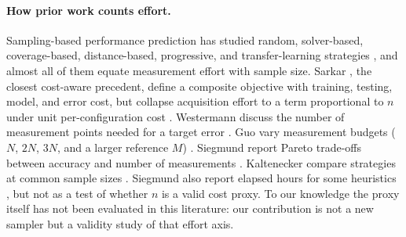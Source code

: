 \paragraph*{How prior work counts effort.}
Sampling-based performance prediction has studied random, solver-based,
coverage-based, distance-based, progressive, and transfer-learning strategies
\cite{guo2013ASE,sarkar2015,siegmund2015FSE,nair2018c,kaltenecker2019,julianasurvey},
and almost all of them equate measurement effort with sample size. Sarkar
\etal, the closest cost-aware precedent, define a composite objective with
training, testing, model, and error cost, but collapse acquisition effort to a
term proportional to $n$ under unit per-configuration cost \cite{sarkar2015}.
Westermann \etal discuss the number of measurement points needed for a target
error \cite{westermann2012}. Guo \etal vary measurement budgets ($N$, $2N$,
$3N$, and a larger reference $M$) \cite{guo2013ASE}. Siegmund \etal report
Pareto trade-offs between accuracy and number of measurements
\cite{siegmund2015FSE}. Kaltenecker \etal compare strategies at common
sample sizes \cite{kaltenecker2019}. Siegmund \etal also report elapsed hours
for some heuristics \cite{siegmund2012a}, but not as a test of whether $n$ is a
valid cost proxy. To our knowledge the proxy itself has not been evaluated in
this literature: our contribution is not a new sampler but a validity study of
that effort axis.

